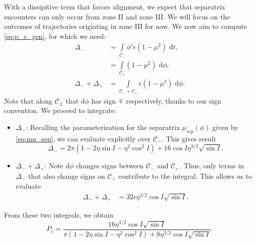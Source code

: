 \documentclass[
        fleqn,
        usenatbib,
    ]{mnras}
\newcommand*{\p}[1]{\left(#1\right)}
\begin{document}
With a dissipitive term that favors alignment, we expect that separatrix
encounters can only occur from zone II and zone III\@. We will focus on the
outcomes of trajectories origiating in zone III for now. We now aim to compute
\autoref{eq:p_c_gen}, for which we need:
\begin{subequations}
    \begin{align}
        \Delta_- &= \int\limits_{\mathcal{C}_-}
                \phi'\epsilon\p{1 - \mu^2}\;\mathrm{d}t,\nonumber\\
            &= \int\limits_{\mathcal{C}_s}
                \p{1 - \mu^2}\;\mathrm{d}\phi,\\
        \Delta_- + \Delta_+ &= \int\limits_{\mathcal{C}_- + \mathcal{C}_+}
            \epsilon\p{1 - \mu^2}\;\mathrm{d}\phi.
    \end{align}
\end{subequations}
Note that along $\mathcal{C}_{\pm}$ that $\mathrm{d}\phi$ has sign $\mp$
respectively, thanks to our sign convention. We proceed to integrate:
\begin{itemize}
    \item $\Delta_-$: Recalling the parameterization for the separatrix
        $\mu_{sep}(\phi)$ given by \autoref{eq:mu_sep}, we can evaluate
        explicitly over $\mathcal{C}_-$. This gives result
        \begin{equation}
            \Delta_- = 2\pi\p{1 - 2\eta \sin I - \eta^2 \cos^2 I}
                + 16\cos I \eta^{3/2}\sqrt{\sin I}.
        \end{equation}

    \item $\Delta_- + \Delta_+$: Note $\mathrm{d}\phi$ changes signs between
        $\mathcal{C}_-$ and $\mathcal{C}_+$. Thus, only terms in $\Delta_-$ that
        also change signs on $\mathcal{C}_+$ contribute to the integral. This
        allows us to evaluate
        \begin{align}
            \Delta_- + \Delta_+ &= 32\epsilon \eta^{3/2} \cos I \sqrt{\sin I}.
        \end{align}
\end{itemize}
From these two integrals, we obtain
\begin{equation}
    P_c = \frac{16\eta^{3/2}\cos I \sqrt{\sin I}}{\pi
        \p{1 - 2\eta \sin I - \eta^2 \cos^2 I}
        + 8\eta^{3/2}\cos I \sqrt{\sin I}}.\label{eq:p1pc}
\end{equation}
\end{document}
